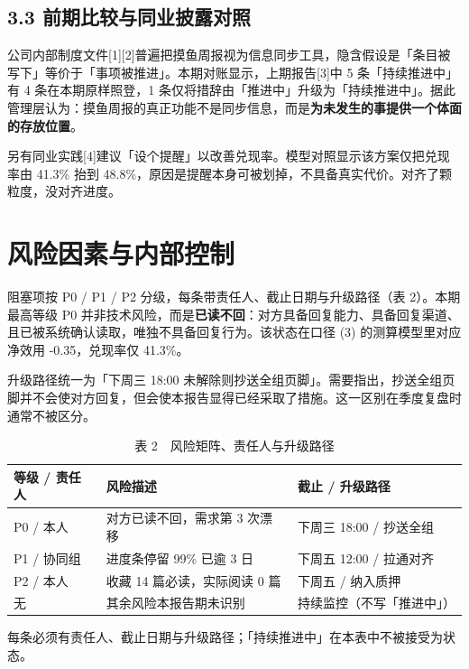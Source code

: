 \documentclass[11pt,a4paper]{article}
\begin{document}
\subsection{3.3 前期比较与同业披露对照}
公司内部制度文件[1][2]普遍把摸鱼周报视为信息同步工具，隐含假设是「条目被写下」等价于「事项被推进」。本期对账显示，上期报告[3]中 5 条「持续推进中」有 4 条在本期原样照登，1 条仅将措辞由「推进中」升级为「持续推进中」。据此管理层认为：摸鱼周报的真正功能不是同步信息，而是\textbf{为未发生的事提供一个体面的存放位置}。

另有同业实践[4]建议「设个提醒」以改善兑现率。模型对照显示该方案仅把兑现率由 41.3\% 抬到 48.8\%，原因是提醒本身可被划掉，不具备真实代价。对齐了颗粒度，没对齐进度。

\section{风险因素与内部控制}
阻塞项按 P0 / P1 / P2 分级，每条带责任人、截止日期与升级路径（表 2）。本期最高等级 P0 并非技术风险，而是\textbf{已读不回}：对方具备回复能力、具备回复渠道、且已被系统确认读取，唯独不具备回复行为。该状态在口径 (3) 的测算模型里对应净效用 -0.35，兑现率仅 41.3\%。

升级路径统一为「下周三 18:00 未解除则抄送全组页脚」。需要指出，抄送全组页脚并不会使对方回复，但会使本报告显得已经采取了措施。这一区别在季度复盘时通常不被区分。

\begin{table}[ht]
\centering
\small
\caption*{表 2　风险矩阵、责任人与升级路径}
\begin{tabular}{ m{} m{} m{} }
\hline\hline
\textbf{等级 / 责任人} & \textbf{风险描述} & \textbf{截止 / 升级路径} \\
\hline

P0 / 本人 & 对方已读不回，需求第 3 次漂移 & 下周三 18:00 / 抄送全组 \\

P1 / 协同组 & 进度条停留 99\% 已逾 3 日 & 下周五 12:00 / 拉通对齐 \\

P2 / 本人 & 收藏 14 篇必读，实际阅读 0 篇 & 下周五 / 纳入质押 \\

无 & 其余风险本报告期未识别 & 持续监控（不写「推进中」） \\

\hline\hline
\end{tabular}
\par\vspace{1mm}\footnotesize 每条必须有责任人、截止日期与升级路径；「持续推进中」在本表中不被接受为状态。
\end{table}
\normalsize
\end{document}
